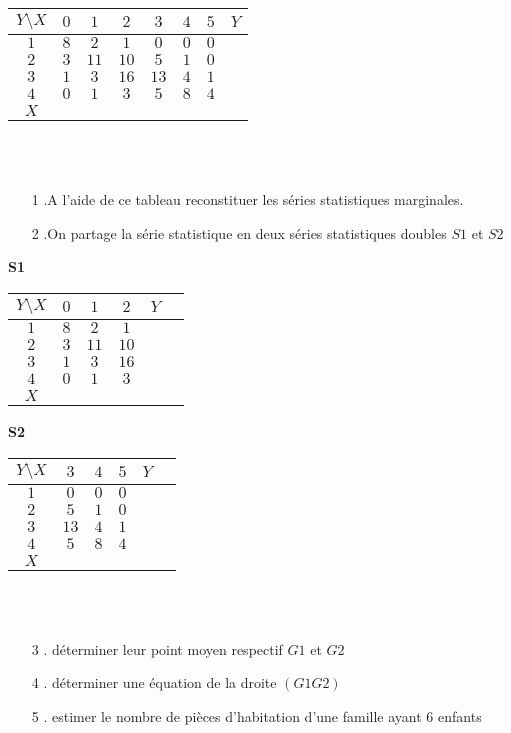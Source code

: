 \documentclass[12pt]{article}
\begin{document}
\begin{tabular}{|c|c|c|c|c|c|c|c|}
\hline
$Y\setminus X$  & $0$ & $1$ & $2$ & $3$ & $4$ &$5$ & $Y$\\
\hline
$1$ & $8$ & $2$ & $1$ & $0$ & $0$ & $0$ &\\
\hline
$2	$  & $3$ & $11$ & $10$ & $5$ & $1$ & $0$ &\\
\hline
$3$ & $1$ & $3$ & $16$ & $13$ & $4$ & $1$ &\\
\hline
$4$  & $0$ & $1$ & $3$ & $5$ & $8$ & $4$ &\\
\hline
$X$ &  &  &  & & & &\\
\hline
\end{tabular}\\
\\
\begin{itemize}
\item[1].A l’aide de ce tableau reconstituer les séries statistiques marginales.

\item[2].On partage la série statistique en deux séries statistiques doubles $S1$ et $S2$\\
\end{itemize}
\textbf{S1}
\begin{tabular}{|c|c|c|c|c|c|}
\hline
$Y\setminus X$  & $0$ & $1$ & $2$ & $Y$ \\
\hline
$1$ & $8$ & $2$ & $1$ &   \\
\hline
$2	$  & $3$ & $11$ & $10$ &   \\
\hline
$3$ & $1$ & $3$ & $16$ & \\
\hline
$4$  & $0$ & $1$ & $3$ &   \\
\hline
$X$ &  &  &  &   \\
\hline
\end{tabular}
\textbf{S2}
\begin{tabular}{|c|c|c|c|c|c|}
\hline
$Y\setminus X$  & $3$ & $4$ & $5$ & $Y$ \\
\hline
$1$ & $0$ & $0$ & $0$ &   \\
\hline
$2	$  & $5$ & $1$ & $0$ &   \\
\hline
$3$ & $13$ & $4$ & $1$ & \\
\hline
$4$  & $5$ & $8$ & $4$ &   \\
\hline
$X$ &  &  &  &   \\
\hline
\end{tabular}\\
\\
\begin{itemize}
\item[3]. déterminer leur point moyen respectif $G1$ et $G2$ 

\item[4]. déterminer une équation de la droite $(G1G2)$

\item[5]. estimer le nombre de pièces d’habitation d’une famille ayant $6$ enfants
\end{itemize}
\end{document}
